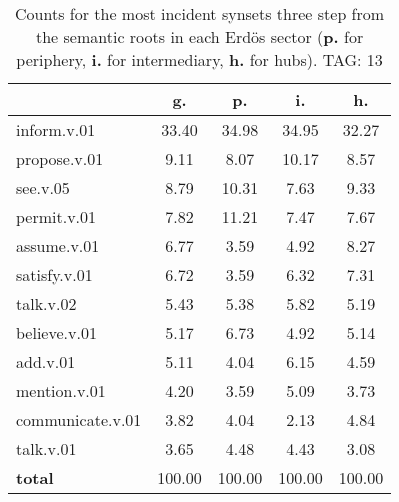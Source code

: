 \begin{table}[h!]
\begin{center}
\begin{tabular}{| l | c | c | c | c |}\hline
 & g. & p. & i. & h. \\\hline
inform.v.01 & 33.40  & 34.98  & 34.95  & 32.27 \\\hline
propose.v.01 & 9.11  & 8.07  & 10.17  & 8.57 \\\hline
see.v.05 & 8.79  & 10.31  & 7.63  & 9.33 \\\hline
permit.v.01 & 7.82  & 11.21  & 7.47  & 7.67 \\\hline
assume.v.01 & 6.77  & 3.59  & 4.92  & 8.27 \\\hline
satisfy.v.01 & 6.72  & 3.59  & 6.32  & 7.31 \\\hline
talk.v.02 & 5.43  & 5.38  & 5.82  & 5.19 \\\hline
believe.v.01 & 5.17  & 6.73  & 4.92  & 5.14 \\\hline
add.v.01 & 5.11  & 4.04  & 6.15  & 4.59 \\\hline
mention.v.01 & 4.20  & 3.59  & 5.09  & 3.73 \\\hline
communicate.v.01 & 3.82  & 4.04  & 2.13  & 4.84 \\\hline
talk.v.01 & 3.65  & 4.48  & 4.43  & 3.08 \\\hline
{{\bf total}} & 100.00  & 100.00  & 100.00  & 100.00 \\\hline
\end{tabular}
\caption{Counts for the most incident synsets three step from the semantic roots in each Erd\"os sector ({\bf p.} for periphery, {\bf i.} for intermediary, {\bf h.} for hubs). TAG: 13}
\end{center}
\end{table}